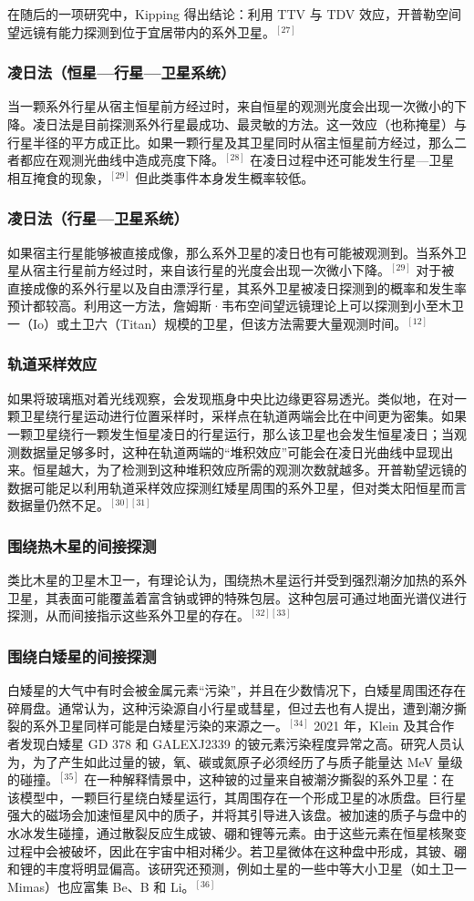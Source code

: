 在随后的一项研究中，Kipping 得出结论：利用 TTV 与 TDV 效应，开普勒空间望远镜有能力探测到位于宜居带内的系外卫星。$^{[27]}$
\subsubsection{凌日法（恒星—行星—卫星系统）}
当一颗系外行星从宿主恒星前方经过时，来自恒星的观测光度会出现一次微小的下降。凌日法是目前探测系外行星最成功、最灵敏的方法。这一效应（也称掩星）与行星半径的平方成正比。如果一颗行星及其卫星同时从宿主恒星前方经过，那么二者都应在观测光曲线中造成亮度下降。$^{[28]}$
在凌日过程中还可能发生行星—卫星相互掩食的现象，$^{[29]}$ 但此类事件本身发生概率较低。
\subsubsection{凌日法（行星—卫星系统）}
如果宿主行星能够被直接成像，那么系外卫星的凌日也有可能被观测到。当系外卫星从宿主行星前方经过时，来自该行星的光度会出现一次微小下降。$^{[29]}$
对于被直接成像的系外行星以及自由漂浮行星，其系外卫星被凌日探测到的概率和发生率预计都较高。利用这一方法，詹姆斯·韦布空间望远镜理论上可以探测到小至木卫一（Io）或土卫六（Titan）规模的卫星，但该方法需要大量观测时间。$^{[12]}$
\subsubsection{轨道采样效应}
如果将玻璃瓶对着光线观察，会发现瓶身中央比边缘更容易透光。类似地，在对一颗卫星绕行星运动进行位置采样时，采样点在轨道两端会比在中间更为密集。如果一颗卫星绕行一颗发生恒星凌日的行星运行，那么该卫星也会发生恒星凌日；当观测数据量足够多时，这种在轨道两端的“堆积效应”可能会在凌日光曲线中显现出来。恒星越大，为了检测到这种堆积效应所需的观测次数就越多。开普勒望远镜的数据可能足以利用轨道采样效应探测红矮星周围的系外卫星，但对类太阳恒星而言数据量仍然不足。$^{[30][31]}$
\subsubsection{围绕热木星的间接探测}

类比木星的卫星木卫一，有理论认为，围绕热木星运行并受到强烈潮汐加热的系外卫星，其表面可能覆盖着富含钠或钾的特殊包层。这种包层可通过地面光谱仪进行探测，从而间接指示这些系外卫星的存在。$^{[32][33]}$
\subsubsection{围绕白矮星的间接探测}
白矮星的大气中有时会被金属元素“污染”，并且在少数情况下，白矮星周围还存在碎屑盘。通常认为，这种污染源自小行星或彗星，但过去也有人提出，遭到潮汐撕裂的系外卫星同样可能是白矮星污染的来源之一。$^{[34]}$
2021 年，Klein 及其合作者发现白矮星 GD 378 和 GALEXJ2339 的铍元素污染程度异常之高。研究人员认为，为了产生如此过量的铍，氧、碳或氮原子必须经历了与质子能量达 MeV 量级的碰撞。$^{[35]}$
在一种解释情景中，这种铍的过量来自被潮汐撕裂的系外卫星：在该模型中，一颗巨行星绕白矮星运行，其周围存在一个形成卫星的冰质盘。巨行星强大的磁场会加速恒星风中的质子，并将其引导进入该盘。被加速的质子与盘中的水冰发生碰撞，通过散裂反应生成铍、硼和锂等元素。由于这些元素在恒星核聚变过程中会被破坏，因此在宇宙中相对稀少。若卫星微体在这种盘中形成，其铍、硼和锂的丰度将明显偏高。该研究还预测，例如土星的一些中等大小卫星（如土卫一 Mimas）也应富集 Be、B 和 Li。$^{[36]}$

